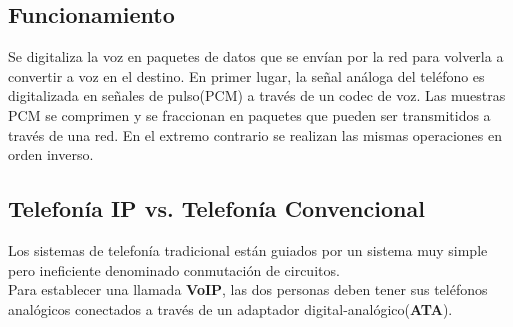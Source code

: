 \documentclass[a4paper, 11pt]{article} %
\begin{document}
	\subsection{Funcionamiento}
		Se digitaliza la voz en paquetes de datos que se envían por la red para volverla a convertir a voz en el destino. En primer lugar, la señal análoga del teléfono es digitalizada en señales de pulso(PCM) a través de un codec de voz. 
		Las muestras PCM se comprimen y se fraccionan en paquetes que pueden ser transmitidos a través de una red. En el extremo contrario se realizan las mismas operaciones en orden inverso.
	
	\subsection{Telefonía IP vs. Telefonía Convencional}
		Los sistemas de telefonía tradicional están guiados por un sistema muy simple pero ineficiente denominado conmutación de circuitos.\\
		Para establecer una llamada \textbf{VoIP}, las dos personas deben tener sus teléfonos analógicos conectados a través de un adaptador digital-analógico(\textbf{ATA}).\\
\end{document}
